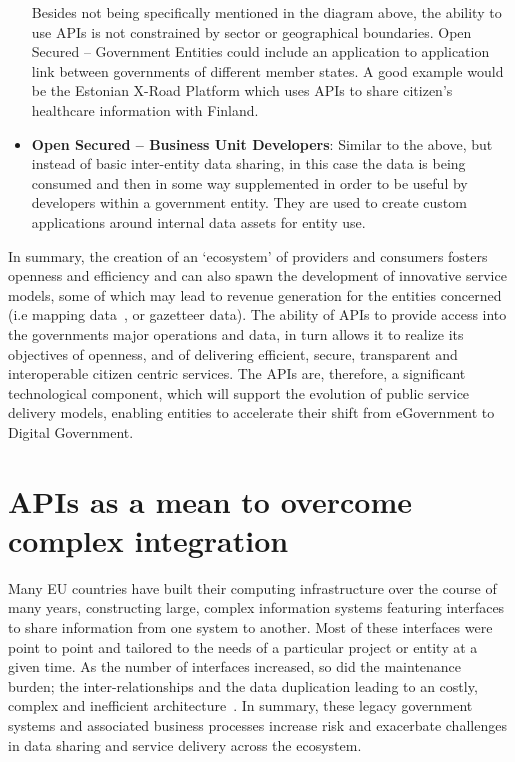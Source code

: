 \begin{itemize}
	 Besides not being specifically mentioned in the diagram above, the ability to use
	 APIs is not constrained by sector or geographical boundaries. Open Secured
	 – Government Entities could include an application to application link
	 between governments of different member states. A good example would be the Estonian X-Road Platform which uses APIs to
	 share citizen’s healthcare information with Finland.
	 
	 \item \textbf{Open Secured – Business Unit Developers}: Similar to the above, but instead of basic inter-entity data sharing, in this case the data is being
	 consumed and then in some way supplemented in order to be useful by developers
	 within a government entity. They are used to create custom applications around
	 internal data assets for entity use.
\end{itemize}

In summary, the creation of an ‘ecosystem’ of providers and consumers fosters
openness and efficiency and can also spawn the development of innovative service
models, some of which may lead to revenue generation for the entities concerned
(i.e mapping data~\citep{os_places}, or gazetteer data). The ability of APIs to provide access
into the governments major operations and data, in turn allows it to realize its objectives
of openness, and of delivering efficient, secure, transparent and interoperable
citizen centric services. The APIs are, therefore, a significant technological
component, which will support the evolution of public service delivery
models, enabling entities to accelerate their shift from eGovernment to
Digital Government.

\section{APIs as a mean to overcome complex integration}

Many EU countries have built their computing infrastructure over the course of
many years, constructing large, complex information systems featuring
interfaces to share information from one system to another. Most of these
interfaces were point to point and tailored to the needs of a particular
project or entity at a given time. As the number of interfaces increased, so did the
maintenance burden; the inter-relationships and the data duplication leading to an
costly, complex and inefficient architecture~\citep{deloitte_insights}. In summary, these
legacy government systems and associated business processes increase
risk and exacerbate challenges in data sharing and service delivery across the
ecosystem.

